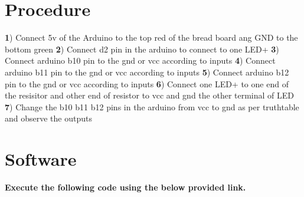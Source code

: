 \documentclass[12pt, a4paper]{article}
\begin{document}
\vspace{5mm}


\section{Procedure}

\textbf 1) Connect 5v of the Arduino to the top red of the bread board ang GND to the bottom green
\hfill \break
\hfill \break
\textbf 2) Connect d2 pin in the arduino to connect to one LED+
\hfill \break
\hfill \break
\textbf 3) Connect arduino b10 pin to the gnd or vcc according to inputs
\hfill \break
\hfill \break
\textbf 4) Connect arduino b11 pin to the gnd or vcc according to inputs
\hfill \break
\hfill \break
\textbf 5) Connect arduino b12 pin to the gnd or vcc according to inputs
\hfill \break
\hfill \break
\textbf 6) Connect one LED+ to one end of the resisitor and other end of resistor to vcc and gnd the other terminal of LED
\hfill \break
\hfill \break
\textbf 7) Change the b10 b11 b12 pins in the arduino from vcc to gnd as per truthtable and observe the outputs
\hfill \break

\vspace{5mm}


\section{Software}
\textbf{Execute the following code using the below provided link.}\\
\begin{center}
\end{center}
 

\vspace{5mm}  


\end{document}
